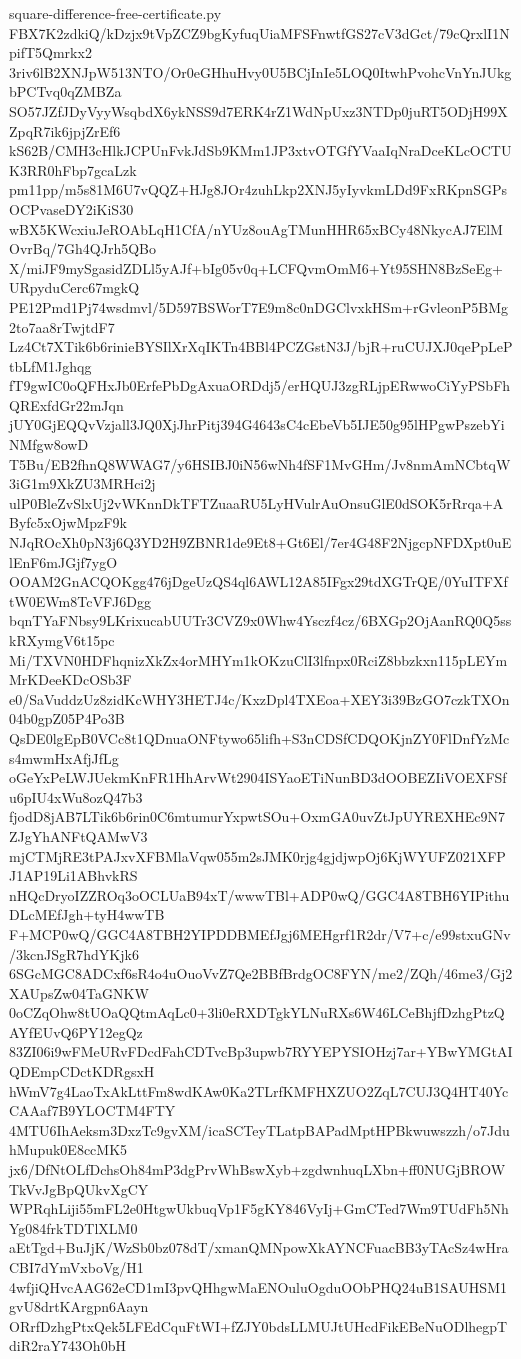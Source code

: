 \documentclass[11pt]{article}
\theoremstyle{definition}
\theoremstyle{remark}
\begin{document}
\begin{filecontents*}[overwrite]{square-difference-free-certificate.py}
FBX7K2zdkiQ/kDzjx9tVpZCZ9bgKyfuqUiaMFSFnwtfGS27cV3dGct/79cQrxlI1NpifT5Qmrkx2
3riv6lB2XNJpW513NTO/Or0eGHhuHvy0U5BCjInIe5LOQ0ItwhPvohcVnYnJUkgbPCTvq0qZMBZa
SO57JZfJDyVyyWsqbdX6ykNSS9d7ERK4rZ1WdNpUxz3NTDp0juRT5ODjH99XZpqR7ik6jpjZrEf6
kS62B/CMH3cHlkJCPUnFvkJdSb9KMm1JP3xtvOTGfYVaaIqNraDceKLcOCTUK3RR0hFbp7gcaLzk
pm11pp/m5s81M6U7vQQZ+HJg8JOr4zuhLkp2XNJ5yIyvkmLDd9FxRKpnSGPsOCPvaseDY2iKiS30
wBX5KWcxiuJeROAbLqH1CfA/nYUz8ouAgTMunHHR65xBCy48NkycAJ7ElMOvrBq/7Gh4QJrh5QBo
X/miJF9mySgasidZDLl5yAJf+bIg05v0q+LCFQvmOmM6+Yt95SHN8BzSeEg+URpyduCerc67mgkQ
PE12Pmd1Pj74wsdmvl/5D597BSWorT7E9m8c0nDGClvxkHSm+rGvleonP5BMg2to7aa8rTwjtdF7
Lz4Ct7XTik6b6rinieBYSIlXrXqIKTn4BBl4PCZGstN3J/bjR+ruCUJXJ0qePpLePtbLfM1Jghqg
fT9gwIC0oQFHxJb0ErfePbDgAxuaORDdj5/erHQUJ3zgRLjpERwwoCiYyPSbFhQRExfdGr22mJqn
jUY0GjEQQvVzjall3JQ0XjJhrPitj394G4643sC4cEbeVb5IJE50g95lHPgwPszebYiNMfgw8owD
T5Bu/EB2fhnQ8WWAG7/y6HSIBJ0iN56wNh4fSF1MvGHm/Jv8nmAmNCbtqW3iG1m9XkZU3MRHci2j
ulP0BleZvSlxUj2vWKnnDkTFTZuaaRU5LyHVulrAuOnsuGlE0dSOK5rRrqa+AByfc5xOjwMpzF9k
NJqROcXh0pN3j6Q3YD2H9ZBNR1de9Et8+Gt6El/7er4G48F2NjgcpNFDXpt0uElEnF6mJGjf7ygO
OOAM2GnACQOKgg476jDgeUzQS4ql6AWL12A85IFgx29tdXGTrQE/0YuITFXftW0EWm8TcVFJ6Dgg
bqnTYaFNbsy9LKrixucabUUTr3CVZ9x0Whw4Ysczf4cz/6BXGp2OjAanRQ0Q5sskRXymgV6t15pc
Mi/TXVN0HDFhqnizXkZx4orMHYm1kOKzuClI3lfnpx0RciZ8bbzkxn115pLEYmMrKDeeKDcOSb3F
e0/SaVuddzUz8zidKcWHY3HETJ4c/KxzDpl4TXEoa+XEY3i39BzGO7czkTXOn04b0gpZ05P4Po3B
QsDE0lgEpB0VCc8t1QDnuaONFtywo65lifh+S3nCDSfCDQOKjnZY0FlDnfYzMcs4mwmHxAfjJfLg
oGeYxPeLWJUekmKnFR1HhArvWt2904ISYaoETiNunBD3dOOBEZIiVOEXFSfu6pIU4xWu8ozQ47b3
fjodD8jAB7LTik6b6rin0C6mtumurYxpwtSOu+OxmGA0uvZtJpUYREXHEc9N7ZJgYhANFtQAMwV3
mjCTMjRE3tPAJxvXFBMlaVqw055m2sJMK0rjg4gjdjwpOj6KjWYUFZ021XFPJ1AP19Li1ABhvkRS
nHQcDryoIZZROq3oOCLUaB94xT/wwwTBl+ADP0wQ/GGC4A8TBH6YIPithuDLcMEfJgh+tyH4wwTB
F+MCP0wQ/GGC4A8TBH2YIPDDBMEfJgj6MEHgrf1R2dr/V7+c/e99stxuGNv/3kcnJSgR7hdYKjk6
6SGcMGC8ADCxf6sR4o4uOuoVvZ7Qe2BBfBrdgOC8FYN/me2/ZQh/46me3/Gj2XAUpsZw04TaGNKW
0oCZqOhw8tUOaQQtmAqLc0+3li0eRXDTgkYLNuRXs6W46LCeBhjfDzhgPtzQAYfEUvQ6PY12egQz
83ZI06i9wFMeURvFDcdFahCDTvcBp3upwb7RYYEPYSIOHzj7ar+YBwYMGtAIQDEmpCDctKDRgsxH
hWmV7g4LaoTxAkLttFm8wdKAw0Ka2TLrfKMFHXZUO2ZqL7CUJ3Q4HT40YcCAAaf7B9YLOCTM4FTY
4MTU6IhAeksm3DxzTc9gvXM/icaSCTeyTLatpBAPadMptHPBkwuwszzh/o7JduhMupuk0E8ccMK5
jx6/DfNtOLfDchsOh84mP3dgPrvWhBswXyb+zgdwnhuqLXbn+ff0NUGjBROWTkVvJgBpQUkvXgCY
WPRqhLiji55mFL2e0HtgwUkbuqVp1F5gKY846VyIj+GmCTed7Wm9TUdFh5NhYg084frkTDTlXLM0
aEtTgd+BuJjK/WzSb0bz078dT/xmanQMNpowXkAYNCFuacBB3yTAcSz4wHraCBI7dYmVxboVg/H1
4wfjiQHvcAAG62eCD1mI3pvQHhgwMaENOuluOgduOObPHQ24uB1SAUHSM1gvU8drtKArgpn6Aayn
ORrfDzhgPtxQek5LFEdCquFtWI+fZJY0bdsLLMUJtUHcdFikEBeNuODlhegpTdiR2raY743Oh0bH

\end{filecontents*}
\end{document}
